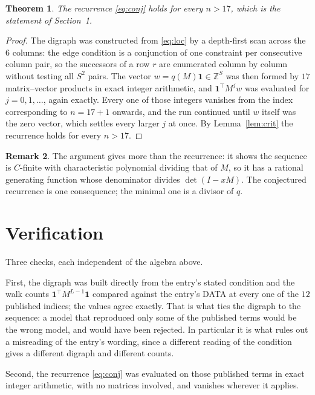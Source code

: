 \documentclass[11pt,a4paper]{article}
\theoremstyle{plain}
\newtheorem{theorem}{Theorem}
\theoremstyle{definition}
\newtheorem{remark}[theorem]{Remark}
\begin{document}
\begin{theorem}
The recurrence \eqref{eq:conj} holds for every $n>17$, which is the statement of
Section~1.
\end{theorem}

\begin{proof}
The digraph was constructed from \eqref{eq:loc} by a depth-first scan across the $6$
columns: the edge condition is a conjunction of one constraint per consecutive column
pair, so the successors of a row $r$ are enumerated column by column without testing all
$S^2$ pairs. The vector $w=q(M)\mathbf{1}\in\mathbb{Z}^{S}$ was then formed by $17$
matrix--vector products in exact integer arithmetic, and $\mathbf{1}^{\!\top}M^{j}w$ was
evaluated for $j=0,1,\dots$, again exactly. Every one of those integers vanishes from the
index corresponding to $n=17+1$ onwards, and the run continued until $w$ itself was the
zero vector, which settles every larger $j$ at once. By Lemma~\ref{lem:crit} the recurrence
holds for every $n>17$.
\end{proof}

\begin{remark}
The argument gives more than the recurrence: it shows the sequence is $C$-finite with
characteristic polynomial dividing that of $M$, so it has a rational generating function
whose denominator divides $\det(I-xM)$. The conjectured recurrence is one consequence; the
minimal one is a divisor of $q$.
\end{remark}

\section{Verification}

Three checks, each independent of the algebra above.

First, the digraph was built directly from the entry's stated condition and the walk counts
$\mathbf{1}^{\!\top}M^{L-1}\mathbf{1}$ compared against the entry's DATA at
every one of the $12$ published indices; the values agree exactly. That is what ties
the digraph to the sequence: a model that reproduced only some of the published terms would
be the wrong model, and would have been rejected. In particular it is what rules out a
misreading of the entry's wording, since a different reading of the condition gives a
different digraph and different counts.

Second, the recurrence \eqref{eq:conj} was evaluated on those published terms in exact
integer arithmetic, with no matrices involved, and vanishes wherever it applies.
\end{document}
